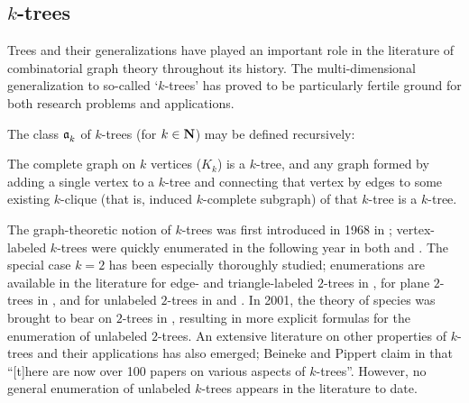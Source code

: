 \documentclass[distribution,draft]{brandiss} %
\numberwithin{section}{chapter}
\numberwithin{figure}{chapter}
\begin{document}
\subsection{$k$-trees}\label{ss:ktrees}
Trees and their generalizations have played an important role in the literature of combinatorial graph theory throughout its history.
The multi-dimensional generalization to so-called `$k$-trees' has proved to be particularly fertile ground for both research problems and applications.

The class $\mathfrak{a}_{k}^{}$ of $k$-trees (for $k \in \mathbf{N}$) may be defined recursively:
\begin{definition}
  \label{def:ktree}
  The complete graph on $k$ vertices ($K_{k}$) is a $k$-tree, and any graph formed by adding a single vertex to a $k$-tree and connecting that vertex by edges to some existing $k$-clique (that is, induced $k$-complete subgraph) of that $k$-tree is a $k$-tree.
\end{definition}

The graph-theoretic notion of $k$-trees was first introduced in 1968 in \cite{harpalm:acycsimp}; vertex-labeled $k$-trees were quickly enumerated in the following year in both \cite{moon:lktrees} and \cite{beinpipp:lktrees}.
The special case $k=2$ has been especially thoroughly studied; enumerations are available in the literature for edge- and triangle-labeled $2$-trees in \cite{palm:l2trees}, for plane $2$-trees in \cite{palmread:p2trees}, and for unlabeled $2$-trees in \cite{harpalm:acycsimp} and \cite{harpalm:graphenum}.
In 2001, the theory of species was brought to bear on $2$-trees in \cite{gessel:spec2trees}, resulting in more explicit formulas for the enumeration of unlabeled $2$-trees.
An extensive literature on other properties of $k$-trees and their applications has also emerged; Beineke and Pippert claim in \cite{beinpipp:multidim} that ``[t]here are now over 100 papers on various aspects of $k$-trees''.
However, no general enumeration of unlabeled $k$-trees appears in the literature to date.
\end{document}
